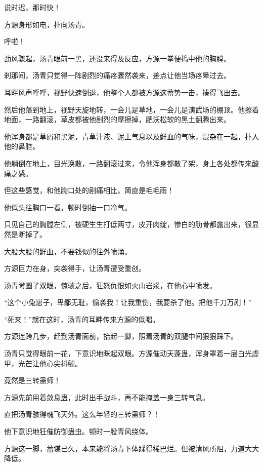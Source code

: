 
\begin{this_body}



说时迟，那时快！

方源身形如电，扑向汤青。

呼啦！

劲风骤起，汤青眼前一黑，还没来得及反应，方源一拳便捣中他的胸膛。

刹那间，汤青只觉得一阵剧烈的痛疼骤然袭来，差点让他当场疼晕过去。

耳畔风声呼呼，视野快速倒退，他整个人都被方源这蓄势一击，揍得飞出去。

然后他落到地上，视野天旋地转，一会儿是草地，一会儿是演武场的棚顶。他擦着地面，一路翻滚，草皮都被他剧烈的摩擦掉，肥沃松软的黑土翻腾出来。

他浑身都是草屑和黑泥，青草汁液、泥土气息以及鲜血的气味，混杂在一起，扑入他的鼻腔。

他躺倒在地上，目光涣散，一路翻滚过来，令他浑身都散了架，身上各处都传来酸痛之感。

但这些感觉，和他胸口处的剧痛相比，简直是毛毛雨！

他低头往胸口一看，顿时倒抽一口冷气。

只见自己的胸膛左侧，被硬生生打低两寸，皮开肉绽，惨白的肋骨都露出来，很显然是断掉了。

大股大股的鲜血，不要钱似的往外喷涌。

方源巨力在身，突袭得手，让汤青遭受重创。

汤青瞪圆了双眼，惊骇之后，狂怒仇恨如火山岩浆，在他心中喷发。

“这个小兔崽子，卑鄙无耻，偷袭我！让我重伤，我要杀了他。把他千刀万剐！”

“死来！”就在这时，汤青的耳畔传来方源的低喝。

方源连跨几步，赶到汤青面前，抬起一脚，照着汤青的双腿中间狠狠踩下。

汤青只觉得眼前一花，下意识地眯起双眼。方源催动天蓬蛊，浑身罩着一层白光虚甲，光芒让他心尖抖颤。

竟然是三转蛊师！

方源先前用着敛息蛊，此时出手战斗，再不能掩盖一身三转气息。

直把汤青骇得魂飞天外。这么年轻的三转蛊师？！

他下意识地狂催防御蛊虫。顿时一股青风绕体。

方源这一脚，蓄谋已久，本来能将汤青下体踩得稀巴烂。但被清风所阻，力道大大降低。


\end{this_body}
